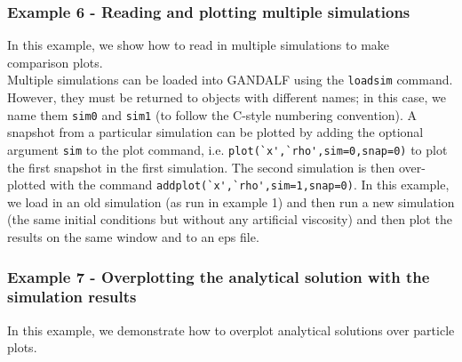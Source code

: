 \documentclass[a4paper]{article}
\newcommand{\var}[1]{\texttt{#1}}
\begin{document}
\subsubsection{Example 6 - Reading  and plotting multiple simulations}
In this example, we show how to read in multiple simulations to make comparison plots. \\







\noindent Multiple simulations can be loaded into GANDALF using the \var{loadsim} command.  However, they must be returned to objects with different names; in this case, we name them \var{sim0} and \var{sim1} (to follow the C-style numbering convention).  A snapshot from a particular simulation can be plotted by adding the optional argument \var{sim} to the plot command, i.e. \lstinline{plot(`x',`rho',sim=0,snap=0)} to plot the first snapshot in the first simulation.  The second simulation is then over-plotted with the command \lstinline{addplot(`x',`rho',sim=1,snap=0)}.  In this example, we load in an old simulation (as run in example 1) and then run a new simulation (the same initial conditions but without any artificial viscosity) and then plot the results on the same window and to an eps file.


\subsubsection{Example  7 - Overplotting the analytical solution with the simulation results}
In this example, we demonstrate how to overplot analytical solutions over particle plots. \\
\end{document}
